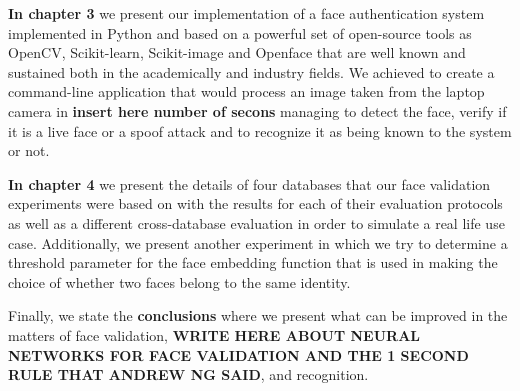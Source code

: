 \textbf{In chapter 3} we present our implementation of a face authentication system implemented in Python and based on a powerful set of open-source tools as OpenCV\cite{opencv_library}, Scikit-learn\cite{scikit-learn}, Scikit-image\cite{scikit-image} and Openface\cite{amos2016openface} that are well known and sustained both in the academically and industry fields. We achieved to create a command-line application that would process an image taken from the laptop camera in \textbf{insert here number of secons} managing to detect the face, verify if it is a live face or a spoof attack and to recognize it as being known to the system or not.

\textbf{In chapter 4} we present the details of four databases that our face validation experiments were based on with the results for each of their evaluation protocols as well as a different cross-database evaluation in order to simulate a real life use case. Additionally, we present another experiment in which we try to determine a threshold parameter for the face embedding function that is used in making the choice of whether two faces belong to the same identity.

Finally, we state the \textbf{conclusions} where we present what can be improved in the matters of face validation, \textbf{WRITE HERE ABOUT NEURAL NETWORKS FOR FACE VALIDATION AND THE 1 SECOND RULE THAT ANDREW NG SAID}, and recognition.
